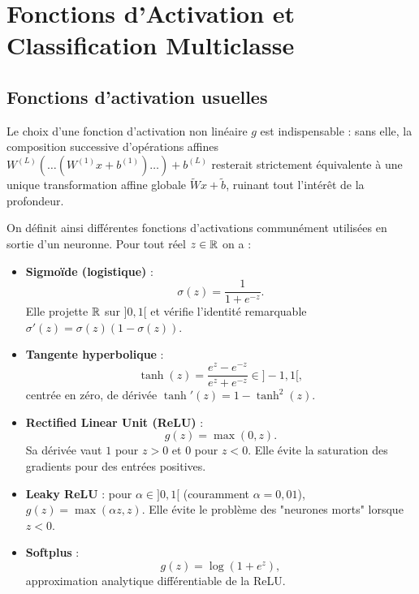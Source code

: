 
\section{Fonctions d'Activation et Classification Multiclasse}

\subsection{Fonctions d'activation usuelles}

Le choix d'une fonction d'activation non linéaire $g$ est indispensable : sans elle, la composition successive d'opérations affines $W^{(L)}(\dots (W^{(1)}x + b^{(1)}) \dots) + b^{(L)}$ resterait strictement équivalente à une unique transformation affine globale $\tilde{W}x + \tilde{b}$, ruinant tout l'intérêt de la profondeur.

\begin{definition}
    On définit ainsi différentes fonctions d'activations communément utilisées en sortie d'un neuronne. Pour tout réel $z \in \mathbb{R}$ on a :
    \begin{itemize}
        \item \textbf{Sigmoïde (logistique)} : 
        \begin{equation}
            \sigma(z) = \frac{1}{1 + e^{-z}}. 
        \end{equation}
        Elle projette $\mathbb{R}$ sur $]0, 1[$ et vérifie l'identité remarquable $\sigma'(z) = \sigma(z)(1 - \sigma(z))$.
        \item \textbf{Tangente hyperbolique} : 
        \begin{equation}
            \tanh(z) = \frac{e^z - e^{-z}}{e^z + e^{-z}} \in ]-1, 1[, 
        \end{equation}
        centrée en zéro, de dérivée $\tanh'(z) = 1 - \tanh^2(z)$.
        \item \textbf{Rectified Linear Unit (ReLU)} : 
        \begin{equation}
            g(z) = \max(0, z).
        \end{equation}
        Sa dérivée vaut $1$ pour $z > 0$ et $0$ pour $z < 0$. Elle évite la saturation des gradients pour des entrées positives.
        \item \textbf{Leaky ReLU} : pour $\alpha \in ]0, 1[$ (couramment $\alpha = 0{,}01$), $g(z) = \max(\alpha z, z)$. Elle évite le problème des "neurones morts" lorsque $z < 0$.
        \item \textbf{Softplus} : 
        \begin{equation}
            g(z) = \log(1 + e^z),
        \end{equation}
        approximation analytique différentiable de la ReLU.
    \end{itemize}
\end{definition}

